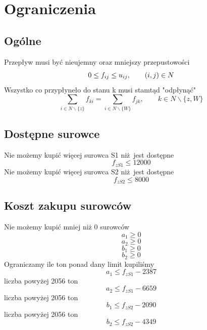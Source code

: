 \section{Ograniczenia}
\subsection{Ogólne}
Przepływ musi być nieujemny oraz mniejszy przepustowości
\begin{equation}
0 \leq f_{ij} \leq u_{ij}, \qquad (i,j) \in N \\
\end{equation}
Wszystko co przypłyneło do stanu k musi stamtąd "odpłynąć"
\begin{equation}
\sum_{i \in N \backslash \{z\}} f_{ki} = \sum_{i \in N \backslash \{W\}} f_{jk}, \qquad k \in N \backslash \{z, W\}
\end{equation}

\subsection{Dostępne surowce}
Nie możemy kupić więcej surowca S1 niż jest dostępne
\begin{equation}
f_{zS1} \leq 12000
\end{equation}
Nie możemy kupić więcej surowca S2 niż jest dostępne
\begin{equation}
f_{zS2} \leq 8000
\end{equation}

\subsection{Koszt zakupu surowców}
Nie możemy kupić mniej niż 0 surowców
\begin{equation}
a_1 \geq 0
\end{equation}
\begin{equation}
a_2 \geq 0
\end{equation}
\begin{equation}
b_1 \geq 0
\end{equation}
\begin{equation}
b_2 \geq 0
\end{equation}
Ograniczamy ile ton ponad dany limit kupiliśmy
\begin{equation}
a_1 \leq f_{zS1} - 2387
\end{equation}
liczba powyżej 2056 ton
\begin{equation}
a_2 \leq f_{zS1} - 6659
\end{equation}
liczba powyżej 2056 ton
\begin{equation}
b_1 \leq f_{zS2} - 2090
\end{equation}
liczba powyżej 2056 ton
\begin{equation}
b_2 \leq f_{zS2} - 4349
\end{equation}
